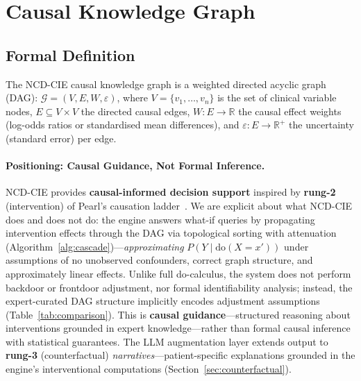 \documentclass[runningheads]{llncs}
\begin{document}
\section{Causal Knowledge Graph}\label{sec:kg}

\subsection{Formal Definition}\label{sec:formal}

The NCD-CIE causal knowledge graph is a weighted directed
acyclic graph (DAG):
$\mathcal{G} = (V, E, W, \varepsilon)$,
where $V=\{v_1,\ldots,v_n\}$ is the set of clinical variable nodes,
$E \subseteq V \times V$ the directed causal edges,
$W: E \rightarrow \mathbb{R}$ the causal effect weights
(log-odds ratios or standardised mean differences), and
$\varepsilon: E \rightarrow \mathbb{R}^+$ the uncertainty
(standard error) per edge.

\paragraph{Positioning: Causal Guidance, Not Formal Inference.}
NCD-CIE provides \textbf{causal-informed decision support}
inspired by \textbf{rung-2} (intervention) of Pearl's causation
ladder~\cite{pearl2018book,hernan2020causal}.
We are explicit about what NCD-CIE does and does not do:
the engine answers what-if queries by propagating
intervention effects through the DAG via topological sorting with
attenuation (Algorithm~\ref{alg:cascade})---\emph{approximating}
$P(Y \mid \mathrm{do}(X = x'))$ under assumptions of no
unobserved confounders, correct graph structure, and approximately
linear effects.
Unlike full do-calculus, the system does not perform backdoor or
frontdoor adjustment, nor formal identifiability analysis;
instead, the expert-curated DAG structure implicitly encodes
adjustment assumptions (Table~\ref{tab:comparison}).
This is \textbf{causal guidance}---structured reasoning about
interventions grounded in expert knowledge---rather than formal
causal inference with statistical guarantees.
The LLM augmentation layer extends output to \textbf{rung-3}
(counterfactual) \emph{narratives}---patient-specific explanations
grounded in the engine's interventional computations
(Section~\ref{sec:counterfactual}).
\end{document}
